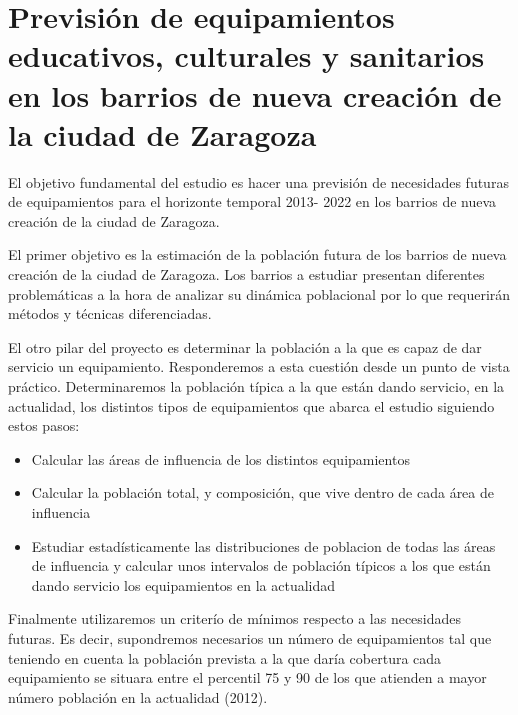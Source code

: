 \chapter{Previsión de equipamientos educativos, culturales y sanitarios en los barrios de nueva creación de la ciudad de Zaragoza}




El objetivo fundamental del estudio es hacer una previsión de necesidades futuras de equipamientos para el horizonte temporal 2013- 2022 en los barrios de nueva creación  de la ciudad de Zaragoza. 



El primer objetivo es la estimación  de la población futura de los barrios de nueva creación de la ciudad de Zaragoza. Los barrios a estudiar presentan diferentes problemáticas a la hora de analizar su dinámica poblacional por lo que requerirán métodos y técnicas diferenciadas.



El otro pilar del proyecto es determinar la población a la que es capaz de dar servicio un equipamiento. Responderemos a esta cuestión desde un punto de vista práctico. Determinaremos la población típica a la que están dando servicio, en la actualidad, los distintos tipos de equipamientos que abarca el estudio siguiendo estos pasos:



\begin{itemize}
\item Calcular las áreas de influencia de los distintos equipamientos
\item Calcular la población total, y composición, que vive dentro de cada área de influencia
\item Estudiar estadísticamente las distribuciones de  poblacion de todas las áreas de influencia y calcular unos intervalos de población típicos a los que están dando servicio los equipamientos en la actualidad
\end{itemize} 

Finalmente utilizaremos un  criterío  de mínimos respecto a las necesidades futuras. Es decir, supondremos necesarios un número de equipamientos tal que teniendo en cuenta la población prevista a la que daría cobertura cada equipamiento se situara entre el percentil 75 y 90 de los que atienden a mayor número población en la actualidad (2012).


